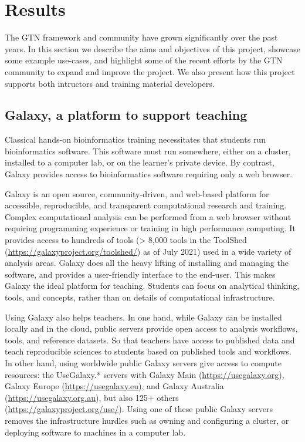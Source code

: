 \documentclass[10pt,letterpaper]{article}
\begin{document}
\section*{Results}

The GTN framework and community have grown significantly over the past years. In this section we describe the aims and objectives of this project, showcase some example use-cases, and highlight some of the recent efforts by the GTN community to expand and improve the project. We also present how this project supports both intructors and training material developers.


\subsection*{Galaxy, a platform to support teaching}

Classical hands-on bioinformatics training necessitates that students run bioinformatics software. This software must run somewhere, either on a cluster, installed to a computer lab, or on the learner's private device. By contrast, Galaxy provides access to bioinformatics software requiring only a web browser.

Galaxy \cite{Jalili2020} is an open source, community-driven, and web-based platform for accessible, reproducible, and transparent computational research and training. Complex computational analysis can be performed from a web browser without requiring programming experience or training in high performance computing. It provides access to hundreds of tools (> 8,000 tools in the ToolShed (\url{https://galaxyproject.org/toolshed/}) as of July 2021) used in a wide variety of analysis areas. Galaxy does all the heavy lifting of installing and managing the software, and provides a user-friendly interface to the end-user. This makes Galaxy the ideal platform for teaching. Students can focus on analytical thinking, tools, and concepts, rather than on details of computational infrastructure. 


Using Galaxy also helps teachers. In one hand, while Galaxy can be installed locally and in the cloud, public servers provide open access to analysis workflows, tools, and reference datasets. So that teachers have access to published data and teach reproducible sciences to students based on published tools and workflows. In other hand, using worldwide public Galaxy servers give access to compute resources: the UseGalaxy.* servers with Galaxy Main (\url{https://usegalaxy.org}), Galaxy Europe (\url{https://usegalaxy.eu}), and Galaxy Australia (\url{https://usegalaxy.org.au}), but also 125+ others (\url{https://galaxyproject.org/use/}). Using one of these public Galaxy servers removes the infrastructure hurdles such as owning and configuring a cluster, or deploying software to machines in a computer lab.
\end{document}
